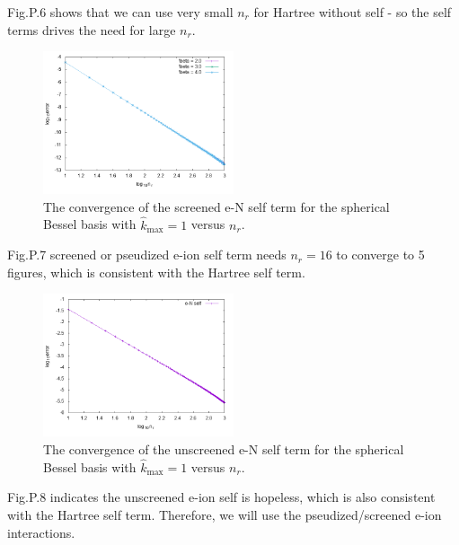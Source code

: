 \documentclass[paper=a4, fontsize=11pt]{article} %
\numberwithin{equation}{section} %
\numberwithin{figure}{section} %
\numberwithin{table}{section} %
\begin{document}
Fig.P.6 shows that we can use very small $n_r$ for Hartree without self - so the self terms drives the need for large $n_r$.

\begin{figure}[h!] 
    \centering
    \includegraphics[width=0.5\textwidth]{eNanalyticscr}
    \caption{The convergence of the screened e-N self term for the spherical Bessel basis with $\hat {k}_{\mathrm{max}} = 1$ versus $n_r$.} 
    \label{fig:eNanalyticscr}
\end{figure}

Fig.P.7 screened or pseudized e-ion self term needs $n_r = 16$ to converge to 5 figures, which is consistent with the Hartree self term.

\begin{figure}[h!] 
    \centering
    \includegraphics[width=0.5\textwidth]{eNanalytic}
    \caption{The convergence of the unscreened e-N self term for the spherical Bessel basis with $\hat {k}_{\mathrm{max}} = 1$ versus $n_r$.} 
    \label{fig:eNanalytic}
\end{figure}

Fig.P.8 indicates the unscreened e-ion self is hopeless, which is also consistent with the Hartree self term. Therefore, we will use the pseudized/screened e-ion interactions.
\end{document}
